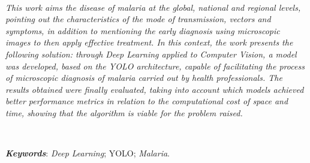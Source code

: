 \ \ \\[2cm]

\noindent \emph{This work aims the disease of malaria at the global, national and regional levels, pointing out the characteristics of the mode of transmission, vectors and symptoms, in addition to mentioning the early diagnosis using microscopic images to then apply effective treatment. In this context, the work presents the following solution: through Deep Learning applied to Computer Vision, a model was developed, based on the YOLO architecture, capable of facilitating the process of microscopic diagnosis of malaria carried out by health professionals. The results obtained were finally evaluated, taking into account which models achieved better performance metrics in relation to the computational cost of space and time, showing that the algorithm is viable for the problem raised.}

\ \ \newline

\noindent \textbf{\emph{Keywords}}: \emph{Deep Learning}; YOLO; \emph{Malaria}.
